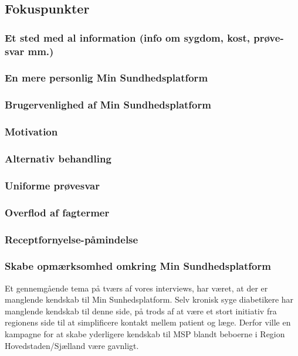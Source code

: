 \subsection{Fokuspunkter}
\subsubsection{Et sted med al information (info om sygdom, kost, prøve-svar mm.)}
\subsubsection{En mere personlig Min Sundhedsplatform}
\subsubsection{Brugervenlighed af Min Sundhedsplatform}
\subsubsection{Motivation}
\subsubsection{Alternativ behandling}
\subsubsection{Uniforme prøvesvar}
\subsubsection{Overflod af fagtermer}
\subsubsection{Receptfornyelse-påmindelse}
\subsubsection{Skabe opmærksomhed omkring Min Sundhedsplatform}
Et gennemgående tema på tværs af vores interviews, har været, at der er manglende kendskab til Min Sunhedsplatform. Selv kronisk syge diabetikere har manglende kendskab til denne side, på trods af at være et stort initiativ fra regionens side til at simplificere kontakt mellem patient og læge. Derfor ville en kampagne for at skabe yderligere kendskab til MSP blandt beboerne i Region Hovedstaden/Sjælland være gavnligt.

